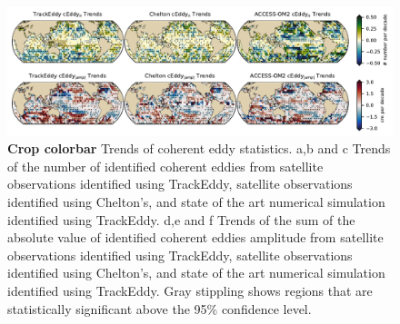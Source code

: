 \documentclass[draft]{agujournal2019}
\begin{document}
	\begin{figure}
	    \centering
	    \includegraphics[width=1\textwidth]{figures/all_trackeddy_trends.pdf}
	    \caption{\textbf{Crop colorbar}
		Trends of coherent eddy statistics. a,b and c Trends of the number of identified coherent eddies from satellite observations identified using TrackEddy, satellite observations identified using Chelton's, and state of the art numerical simulation identified using TrackEddy. d,e and f Trends of the sum of the absolute value of identified coherent eddies amplitude from satellite observations identified using TrackEddy, satellite observations identified using Chelton's, and state of the art numerical simulation identified using TrackEddy. Gray stippling shows regions that are statistically significant above the 95\% confidence level.
		}
	    \label{fig:my_label}
	\end{figure}

	
	
\end{document}
